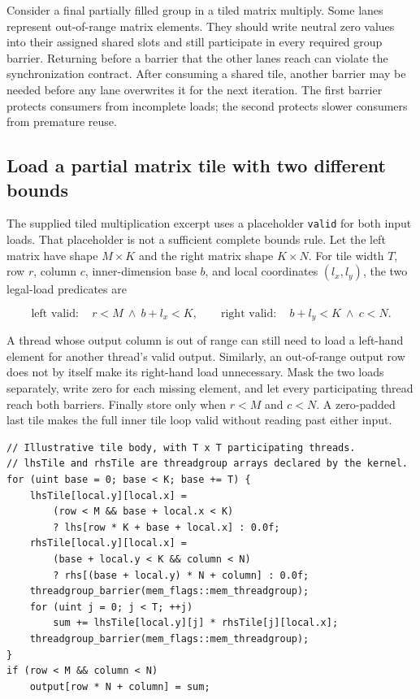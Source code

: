 Consider a final partially filled group in a tiled matrix multiply. Some lanes represent out-of-range matrix elements. They should write neutral zero values into their assigned shared slots and still participate in every required group barrier. Returning before a barrier that the other lanes reach can violate the synchronization contract. After consuming a shared tile, another barrier may be needed before any lane overwrites it for the next iteration. The first barrier protects consumers from incomplete loads; the second protects slower consumers from premature reuse.

\subsection{Load a partial matrix tile with two different bounds}\label{01-foundations-i-ch008-load-a-partial-matrix-tile-with-two-different-bounds}

The supplied tiled multiplication excerpt uses a placeholder \texttt{valid} for both input loads. That placeholder is not a sufficient complete bounds rule. Let the left matrix have shape \(M\times K\) and the right matrix shape \(K\times N\). For tile width \(T\), row \(r\), column \(c\), inner-dimension base \(b\), and local coordinates \((l_x,l_y)\), the two legal-load predicates are

\[
\text{left valid}:\quad r<M\ \land\ b+l_x<K,
\qquad
\text{right valid}:\quad b+l_y<K\ \land\ c<N.
\]

A thread whose output column is out of range can still need to load a left-hand element for another thread's valid output. Similarly, an out-of-range output row does not by itself make its right-hand load unnecessary. Mask the two loads separately, write zero for each missing element, and let every participating thread reach both barriers. Finally store only when \(r<M\) and \(c<N\). A zero-padded last tile makes the full inner tile loop valid without reading past either input.

\begin{verbatim}
// Illustrative tile body, with T x T participating threads.
// lhsTile and rhsTile are threadgroup arrays declared by the kernel.
for (uint base = 0; base < K; base += T) {
    lhsTile[local.y][local.x] =
        (row < M && base + local.x < K)
        ? lhs[row * K + base + local.x] : 0.0f;
    rhsTile[local.y][local.x] =
        (base + local.y < K && column < N)
        ? rhs[(base + local.y) * N + column] : 0.0f;
    threadgroup_barrier(mem_flags::mem_threadgroup);
    for (uint j = 0; j < T; ++j)
        sum += lhsTile[local.y][j] * rhsTile[j][local.x];
    threadgroup_barrier(mem_flags::mem_threadgroup);
}
if (row < M && column < N)
    output[row * N + column] = sum;
\end{verbatim}

